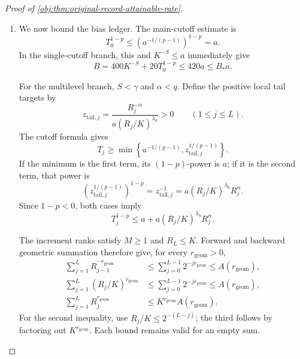 \begin{proof}[Proof of \cref{obj:thm:original-record-attainable-rate}]
\begin{enumerate}
The bounds \(E/\gamma\le1\), \(E/S<2\), and \(E/(p-1)<1\) give
\[
a^{-1/\gamma}=s^{E/\gamma}\le s,
\qquad
a^{-1/S}=s^{E/S}\le s^2,
\qquad
1\le a^{-1/(p-1)}=s^{E/(p-1)}\le s.
\]
Thus \(M\le2s\). For the fine rank, if \(a^{-1/S}\le M\), dyadic idempotence gives \(K=M\le2s\le2s^2\); if \(M<a^{-1/S}\), rounding gives \(K\le2a^{-1/S}\le2s^2\). In either case,
\[
M\le2s,\qquad K\le2s^2.
\]

For the increment-cutoff bounds, the public quantities in either score branch are
\[
L=\log_2(K/M)\in\mathbb N_0,\qquad
R_j=2^jM\quad(0\le j\le L),
\]
\[
T_j=
\mathcal R\!\left(
\max\left\{
1,\min\left\{
a^{-1/(p-1)},
\left[
\frac{R_j^{-\alpha}}{a(R_j/K)^{\lambda_0}}
\right]^{1/(p-1)}
\right\}
\right\}
\right)
\quad(1\le j\le L).
\]
The single-cutoff score uses the main cutoff
\[
T_0=\mathcal R(a^{-1/(p-1)}).
\]
Since the argument defining each \(T_j\) lies between \(1\) and
\(a^{-1/(p-1)}\), rounding and monotonicity yield
\[
1\le T_0\le2s,\qquad
1\le T_j\le T_0\quad(1\le j\le L).
\]
These statements also cover \(L=0\), when the increment index set is empty.

\item We now bound the bias ledger. The main-cutoff estimate is
\[
T_0^{1-p}
\le\left(a^{-1/(p-1)}\right)^{1-p}
=a.
\]
In the single-cutoff branch, this and \(K^{-S}\le a\) immediately give
\[
B=400K^{-S}+20T_0^{1-p}\le420a\le B_*a.
\]

For the multilevel branch, \(S<\gamma\) and \(\alpha<q\). Define the positive local tail targets by
\[
z_{\mathrm{tail},j}
=\frac{R_j^{-\alpha}}{a(R_j/K)^{\lambda_0}}>0
\qquad(1\le j\le L).
\]
The cutoff formula gives
\[
T_j\ge
\min\left\{a^{-1/(p-1)},z_{\mathrm{tail},j}^{1/(p-1)}\right\}.
\]
If the minimum is the first term, its \((1-p)\)-power is \(a\); if it is the second term, that power is
\[
\left(z_{\mathrm{tail},j}^{1/(p-1)}\right)^{1-p}
=z_{\mathrm{tail},j}^{-1}
=a(R_j/K)^{\lambda_0}R_j^\alpha.
\]
Since \(1-p<0\), both cases imply
\[
T_j^{1-p}
\le a+a(R_j/K)^{\lambda_0}R_j^\alpha.
\]

The increment ranks satisfy \(M\ge1\) and \(R_L\le K\). Forward and backward geometric summation therefore give, for every \(r_{\mathrm{geom}}>0\),
\[
\begin{aligned}
\sum_{j=1}^{L}R_{j-1}^{-r_{\mathrm{geom}}}
&\le\sum_{j=0}^{L-1}2^{-jr_{\mathrm{geom}}}
\le A(r_{\mathrm{geom}}),\\
\sum_{j=1}^{L}(R_j/K)^{r_{\mathrm{geom}}}
&\le\sum_{j=0}^{L-1}2^{-jr_{\mathrm{geom}}}
\le A(r_{\mathrm{geom}}),\\
\sum_{j=1}^{L}R_j^{r_{\mathrm{geom}}}
&\le K^{r_{\mathrm{geom}}}A(r_{\mathrm{geom}}).
\end{aligned}
\]
For the second inequality, use \(R_j/K\le2^{-(L-j)}\); the third follows by factoring out \(K^{r_{\mathrm{geom}}}\). Each bound remains valid for an empty sum.


\end{enumerate}
\end{proof}
